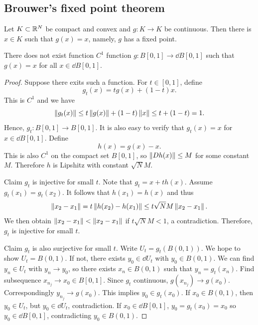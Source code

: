 \documentclass[a4paper]{article}
\begin{document}
\subsection{Brouwer's fixed point theorem}

\begin{thm}
  Let $K \subset \mathbb{R}^N$ be compact and convex and $g : K \to K$ be
  continuous. Then there is $x \in K$ such that $g(x) = x$, namely, $g$
  has a fixed point.
\end{thm}

\begin{lemma}
  There does not exist function $C^1$ function $g : B[0, 1] \to \dd B[0,
        1]$ such that $g(x) = x$ for all $x \in \dd B[0, 1]$.
\end{lemma}

\begin{proof}
  Suppose there exits such a function. For $t \in [0, 1]$, define
  \[
    g_t(x) = t g(x) + (1 - t) x.
  \]
  This is $C^1$ and we have
  \[
    \left\lVert g_t(x)\right\rVert  \leq t \left\lVert g(x)\right\rVert + (1 - t) \left\lVert x\right\rVert
    \leq t + (1 - t) = 1.
  \]
  Hence, $g_t : B[0, 1] \to B[0, 1]$. It is also easy to verify that
  $g_t(x) = x$ for $x \in \dd B[0, 1]$. Define
  \[
    h(x) = g(x) - x.
  \]
  This is also $C^1$ on the compact set $B[0, 1]$, so $\left\lVert Dh(x)\right\rVert \leq
  M$ for some constant $M$. Therefore $h$ is Lipshitz with constant
  $\sqrt{N} M$.

  Claim $g_t$ is injective for small $t$. Note that $g_t = x + t h(x)$.
  Assume $g_t(x_1) = g_t (x_2)$. It follows that $h(x_1) = h(x)$ and thus
  \[
    \left\lVert x_2 - x_1\right\rVert = t \left\lVert h(x_2) - h(x_1)\right\rVert \leq t \sqrt{N} M
    \left\lVert x_2 - x_1\right\rVert.
  \]
  We then obtain $\left\lVert x_2 - x_1\right\rVert < \left\lVert x_2 - x_1\right\rVert$ if $t \sqrt{N} M <
  1$, a contradiction. Therefore, $g_t$ is injective for small $t$.

  Claim $g_t$ is also surjective for small $t$. Write $U_t = g_t(B(0,
  1))$. We hope to show $U_t = B(0, 1)$. If not, there exists $y_0 \in \dd
  U_t$ with $y_0 \in B(0, 1)$. We can find $y_n \in U_t$ with $y_n \to
  y_0$, so there exists $x_n \in B(0, 1)$ such that $y_n = g_t(x_n)$. Find
  subsequence $x_{n_j} \to x_0 \in B[0, 1]$. Since $g_t$ continuous,
  $g(x_{n_j}) \to g(x_0)$. Correspondingly $y_{n_j} \to g(x_0)$. This
  implies $y_0 \in g_t(x_0)$. If $x_0 \in B(0, 1)$, then $y_0 \in U_t$,
  but $y_0 \in \dd U_t$, contradiction. If $x_0 \in \dd B[0, 1]$, $y_0 =
  g_t(x_0) = x_0$ so $y_0 \in \dd B[0, 1]$, contradicting $y_0 \in B(0,
  1)$.


\end{proof}
\end{document}
